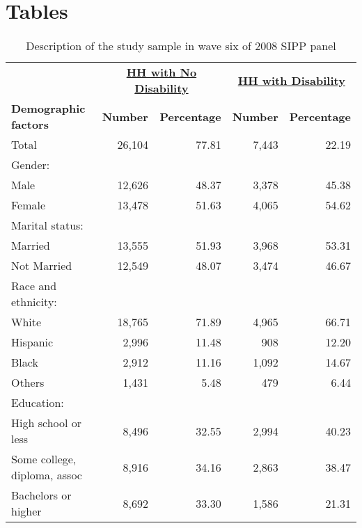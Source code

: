 
\section{Tables}

\noindent
\begin{table}[H] 
\centering 
\caption{Description of the study sample in wave six of 2008 SIPP panel} 
\begin{tabular}{lrrrr}
\hline 
\hline 
& \multicolumn{2}{c}{\underline{\bf{HH with No Disability}}} & \multicolumn{2}{c}{\underline{\bf{HH with Disability}}} \\
{\bf{Demographic factors}} & {\bf{Number}} & {\bf{Percentage}} & {\bf{Number}} & {\bf{Percentage}} \\
\hline 
Total					& 26,104	& 77.81		& 7,443		& 22.19		\\
Gender:					&		&		&		& 		\\
\hspace{5pt} Male			& 12,626	& 48.37		& 3,378		& 45.38		\\
\hspace{5pt} Female			& 13,478	& 51.63		& 4,065		& 54.62		\\
Marital status:				&		&		&		& 		\\
\hspace{5pt} Married			& 13,555	& 51.93		& 3,968		& 53.31		\\
\hspace{5pt} Not Married		& 12,549	& 48.07		& 3,474		& 46.67		\\
Race and ethnicity:			&		&		&		& 		\\
\hspace{5pt} White			& 18,765 	& 71.89		& 4,965		& 66.71		\\
\hspace{5pt} Hispanic			&  2,996	& 11.48		&   908		& 12.20		\\
\hspace{5pt} Black			&  2,912	& 11.16		& 1,092		& 14.67		\\
\hspace{5pt} Others			&  1,431	&  5.48		&   479		&  6.44		\\
Education:				&		&		&		& 		\\
\hspace{5pt} High school or less	&  8,496 	& 32.55		& 2,994		& 40.23		\\
\hspace{5pt} Some college, diploma, assoc& 8,916 	& 34.16		& 2,863		& 38.47		\\
\hspace{5pt} Bachelors or higher	&  8,692 	& 33.30		& 1,586		& 21.31		\\
\hline 
\hline 
\end{tabular}
\label{tab:DescStats}
\end{table}


